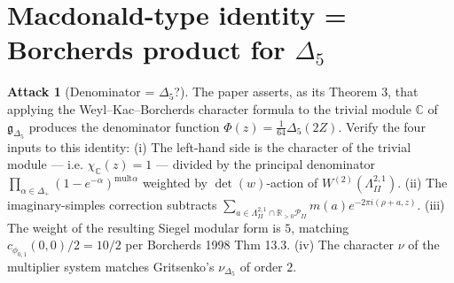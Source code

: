 \documentclass[11pt]{article}
\theoremstyle{definition}
\newtheorem{attack}[theorem]{Attack}
\providecommand{\C}{\mathbb{C}}
\providecommand{\R}{\mathbb{R}}
\providecommand{\g}{\mathfrak{g}}
\providecommand{\mult}{\mathrm{mult}}
\providecommand{\LII}{\Lambda^{2,1}_{I\!I}}
\providecommand{\PII}{\mathcal{P}_{I\!I}}
\providecommand{\Deltafive}{\Delta_5}
\providecommand{\phionezero}{\phi_{0,1}}
\begin{document}
\section{Macdonald-type identity = Borcherds product for $\Deltafive$}

\begin{attack}[Denominator = $\Deltafive$?]
\label{att:denom-delta5}
The paper asserts, as its Theorem 3, that applying the
Weyl--Kac--Borcherds character formula to the trivial module $\C$ of
$\g_{\Deltafive}$ produces the denominator function
$\Phi(z)=\tfrac{1}{64}\Deltafive(2Z)$. Verify the four inputs to this
identity:
(i) The left-hand side is the character of the trivial module --- i.e.
$\chi_\C(z)=1$ --- divided by the principal denominator
$\prod_{\alpha\in\Delta_+}(1-e^{-\alpha})^{\mult\alpha}$ weighted
by $\det(w)$-action of $W^{(2)}(\LII)$.
(ii) The imaginary-simples correction subtracts
$\sum_{a\in\LII\cap\R_{>0}\PII} m(a)e^{-2\pi i(\rho+a,z)}$.
(iii) The weight of the resulting Siegel modular form is $5$,
matching $c_{\phionezero}(0,0)/2=10/2$ per Borcherds 1998 Thm 13.3.
(iv) The character $\nu$ of the multiplier system matches Gritsenko's
$\nu_{\Deltafive}$ of order $2$.
\end{attack}
\end{document}
